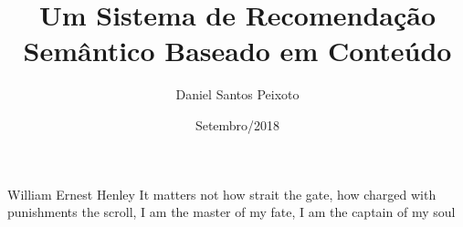 \documentclass[pt,oneside,onehalfspacing,bsc]{risethesis}
\title{Um Sistema de Recomendação Semântico Baseado em Conteúdo}
\date{Setembro/2018}
\author{Daniel Santos Peixoto}
\begin{document}
\frontmatter
\frontpage
\presentationpage

\begin{epigraph}[]{William Ernest Henley}
It matters not how strait the gate, how charged with punishments the scroll, I am the master of my fate, I am the captain of my soul
\end{epigraph}

\resumo

\abstract


\tableofcontents
\listoffigures
\listoftables

\listofacronyms



\mainmatter







% 
\printbibliography

%
\end{document}
